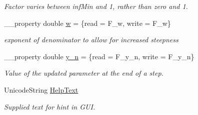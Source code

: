 \begin{DoxyCompactItemize}
\begin{DoxyCompactList}\small\item\em Factor varies between inf\+Min and 1, rather than zero and 1. \end{DoxyCompactList}\item 
\hypertarget{class_t_h_h_kinetics_factor_a19321539d66263eb52d3d61043396fb5}{\+\_\+\+\_\+property double \hyperlink{class_t_h_h_kinetics_factor_a19321539d66263eb52d3d61043396fb5}{w} = \{read = F\+\_\+w, write = F\+\_\+w\}}\label{class_t_h_h_kinetics_factor_a19321539d66263eb52d3d61043396fb5}

\begin{DoxyCompactList}\small\item\em exponent of denominator to allow for increased steepness \end{DoxyCompactList}\item 
\hypertarget{class_t_h_h_kinetics_factor_ab23804a480f61770bddf033f8b71140c}{\+\_\+\+\_\+property double \hyperlink{class_t_h_h_kinetics_factor_ab23804a480f61770bddf033f8b71140c}{y\+\_\+n} = \{read = F\+\_\+y\+\_\+n, write = F\+\_\+y\+\_\+n\}}\label{class_t_h_h_kinetics_factor_ab23804a480f61770bddf033f8b71140c}

\begin{DoxyCompactList}\small\item\em Value of the updated parameter at the end of a step. \end{DoxyCompactList}\item 
\hypertarget{class_t_h_h_kinetics_factor_a7d1576e60493de14fbff12b6860aa905}{Unicode\+String \hyperlink{class_t_h_h_kinetics_factor_a7d1576e60493de14fbff12b6860aa905}{Help\+Text}}\label{class_t_h_h_kinetics_factor_a7d1576e60493de14fbff12b6860aa905}

\begin{DoxyCompactList}\small\item\em Supplied text for hint in G\+U\+I. \end{DoxyCompactList}\end{DoxyCompactItemize}
